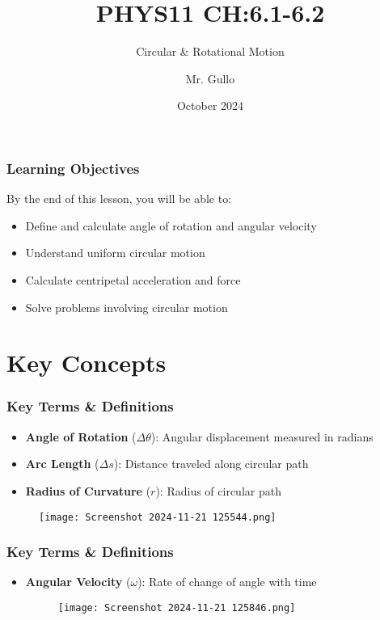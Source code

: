 \documentclass{beamer}
\title[ ]{PHYS11 CH:6.1-6.2}
\subtitle{ Circular \& Rotational Motion }
\author[Mr. Gullo]{Mr. Gullo}
\date[Oct 2024]{October 2024}
\begin{document}
\frame{\titlepage}

\begin{frame}
\frametitle{Learning Objectives}
By the end of this lesson, you will be able to:
\begin{itemize}
    \item Define and calculate angle of rotation and angular velocity
    \item Understand uniform circular motion 
    \item Calculate centripetal acceleration and force
    \item Solve problems involving circular motion
\end{itemize}


\end{frame}

\section{Key Concepts}

\begin{frame}
\frametitle{Key Terms \& Definitions}
\begin{itemize}
    \item \textbf{Angle of Rotation} ($\Delta \theta$): Angular displacement measured in radians
       \item \textbf{Arc Length} ($\Delta s$): Distance traveled along circular path
    \item \textbf{Radius of Curvature} ($r$): Radius of circular path
   
\end{itemize}

\begin{figure}[H]
    \centering
    \texttt{[image: Screenshot 2024-11-21 125544.png]}
\end{figure}

\end{frame}


\begin{frame}
\frametitle{Key Terms \& Definitions}
\begin{itemize}
   
    \item \textbf{Angular Velocity} ($\omega$): Rate of change of angle with time
\begin{figure}[H]
    \centering
    \texttt{[image: Screenshot 2024-11-21 125846.png]}
\end{figure}
\end{itemize}
\end{frame}
\end{document}
